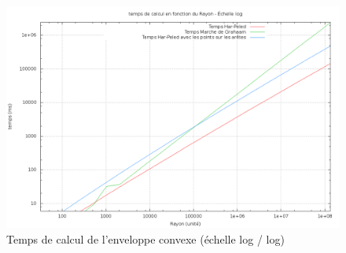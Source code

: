 \begin{figure}[H]
  \centering
  \includegraphics[width=\linewidth]{fig/4-exi/ch/exi-ch-temps.png}
  \caption{Temps de calcul de l'enveloppe convexe (échelle log / log)}
\end{figure}

